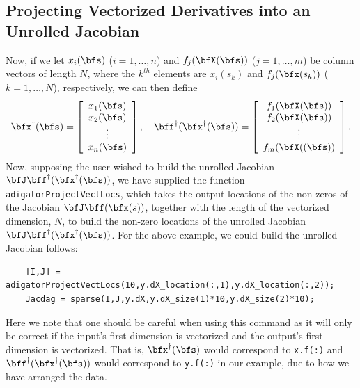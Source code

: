 \documentclass[10pt,pdftex]{article}
\begin{document}
\subsection{Projecting Vectorized Derivatives into an Unrolled Jacobian}
Now, if we let $x_i(\bfs)$ ($i = 1,\dots,n$) and $f_j(\bfX(\bfs))$ ($j = 1,\dots,m$) be column vectors of length $N$, where the $k^{th}$ elements are $x_i(s_k)$  and $f_j(\bfx(s_k))$ ($k = 1,\dots,N$), respectively, we can then define
\begin{equation}
\bfx^\dag(\bfs) = \left[ \begin{array}{c}
x_1(\bfs) \\ x_2(\bfs) \\ \vdots \\ x_n(\bfs)
\end{array}\right], \quad 
\bff^\dag(\bfx^\dag(\bfs)) = \left[ \begin{array}{c}
f_1(\bfX(\bfs)) \\ f_2(\bfX(\bfs)) \\ \vdots \\ f_m(\bfX((\bfs))
\end{array}\right].
\end{equation}
Now, supposing the user wished to build the unrolled Jacobian $\bfJ\bff^\dag(\bfx^\dag(\bfs))$, we have supplied the function \texttt{adigatorProjectVectLocs}, which takes the output locations of the non-zeros of the Jacobian $\bfJ\bff(\bfx(s))$, together with the length of the vectorized dimension, $N$, to build the non-zero locations of the unrolled Jacobian $\bfJ\bff^\dag(\bfx^\dag(\bfs))$. For the above example, we could build the unrolled Jacobian follows:
\begin{verbatim}
    [I,J] = adigatorProjectVectLocs(10,y.dX_location(:,1),y.dX_location(:,2));
    Jacdag = sparse(I,J,y.dX,y.dX_size(1)*10,y.dX_size(2)*10);
\end{verbatim}
Here we note that one should be careful when using this command as it will only be correct if the input's first dimension is vectorized and the output's first dimension is vectorized. That is, $\bfx^\dag(\bfs)$ would correspond to \texttt{x.f(:)}  and $\bff^\dag(\bfx^\dag(\bfs))$ would correspond to \texttt{y.f(:)} in our example, due to how we have arranged the data.
\end{document}
